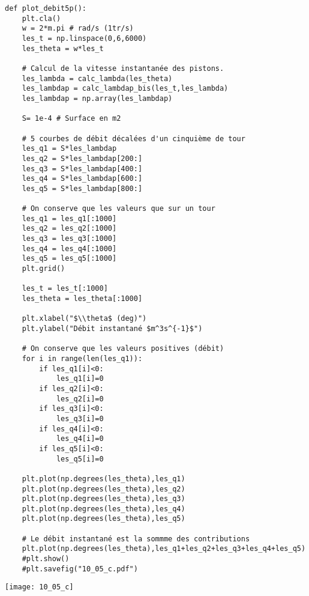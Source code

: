 \ifprof
\begin{lstlisting}
def plot_debit5p():
    plt.cla()
    w = 2*m.pi # rad/s (1tr/s)
    les_t = np.linspace(0,6,6000)
    les_theta = w*les_t
   
    # Calcul de la vitesse instantanée des pistons.
    les_lambda = calc_lambda(les_theta)
    les_lambdap = calc_lambdap_bis(les_t,les_lambda)
    les_lambdap = np.array(les_lambdap)
    
    S= 1e-4 # Surface en m2
    
    # 5 courbes de débit décalées d'un cinquième de tour
    les_q1 = S*les_lambdap
    les_q2 = S*les_lambdap[200:]
    les_q3 = S*les_lambdap[400:]
    les_q4 = S*les_lambdap[600:]
    les_q5 = S*les_lambdap[800:]
    
    # On conserve que les valeurs que sur un tour
    les_q1 = les_q1[:1000]
    les_q2 = les_q2[:1000]
    les_q3 = les_q3[:1000]
    les_q4 = les_q4[:1000]
    les_q5 = les_q5[:1000]
    plt.grid()
    
    les_t = les_t[:1000]
    les_theta = les_theta[:1000]
  
    plt.xlabel("$\\theta$ (deg)")
    plt.ylabel("Débit instantané $m^3s^{-1}$")
    
    # On conserve que les valeurs positives (débit)
    for i in range(len(les_q1)):
        if les_q1[i]<0:
            les_q1[i]=0
        if les_q2[i]<0:
            les_q2[i]=0
        if les_q3[i]<0:
            les_q3[i]=0
        if les_q4[i]<0:
            les_q4[i]=0
        if les_q5[i]<0:
            les_q5[i]=0

    plt.plot(np.degrees(les_theta),les_q1)
    plt.plot(np.degrees(les_theta),les_q2)
    plt.plot(np.degrees(les_theta),les_q3)
    plt.plot(np.degrees(les_theta),les_q4)
    plt.plot(np.degrees(les_theta),les_q5)
    
    # Le débit instantané est la sommme des contributions
    plt.plot(np.degrees(les_theta),les_q1+les_q2+les_q3+les_q4+les_q5)
    #plt.show() 
    #plt.savefig("10_05_c.pdf")
\end{lstlisting}
\begin{center}
\texttt{[image: 10\_05\_c]}
\end{center}
\else
\fi


